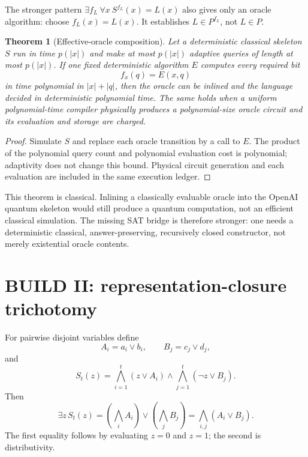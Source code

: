 \documentclass[11pt]{article}
\newtheorem{theorem}{Theorem}
\begin{document}
The stronger pattern $\exists f_L\ \forall x\ S^{f_L}(x)=L(x)$ also gives only
an oracle algorithm: choose $f_L(x)=L(x)$.  It establishes $L\in P^{f_L}$,
not $L\in P$.

\begin{theorem}[Effective-oracle composition]
Let a deterministic classical skeleton $S$ run in time $p(|x|)$ and make at
most $p(|x|)$ adaptive queries of length at most $p(|x|)$.  If one fixed
deterministic algorithm $E$ computes every required bit
\[
 f_x(q)=E(x,q)
\]
in time polynomial in $|x|+|q|$, then the oracle can be inlined and the
language decided in deterministic polynomial time.  The same holds when a
uniform polynomial-time compiler physically produces a polynomial-size oracle
circuit and its evaluation and storage are charged.
\end{theorem}
\begin{proof}
Simulate $S$ and replace each oracle transition by a call to $E$.  The product
of the polynomial query count and polynomial evaluation cost is polynomial;
adaptivity does not change this bound.  Physical circuit generation and each
evaluation are included in the same execution ledger.
\end{proof}

This theorem is classical.  Inlining a classically evaluable oracle into the
OpenAI quantum skeleton would still produce a quantum computation, not an
efficient classical simulation.  The missing SAT bridge is therefore stronger:
one needs a deterministic classical, answer-preserving, recursively closed
constructor, not merely existential oracle contents.

\section{BUILD II: representation-closure trichotomy}
For pairwise disjoint variables define
\[
 A_i=a_i\vee b_i,\qquad B_j=c_j\vee d_j,
\]
and
\[
 S_t(z)=\bigwedge_{i=1}^t(z\vee A_i)\wedge
        \bigwedge_{j=1}^t(\neg z\vee B_j).
\]
Then
\begin{equation}\label{eq:projection}
 \exists z\,S_t(z)
 =\left(\bigwedge_i A_i\right)\vee\left(\bigwedge_j B_j\right)
 =\bigwedge_{i,j}(A_i\vee B_j).
\end{equation}
The first equality follows by evaluating $z=0$ and $z=1$; the second is
distributivity.
\end{document}
